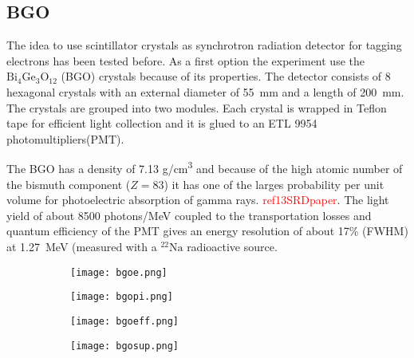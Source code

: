 \subsection{BGO}
The idea to use scintillator crystals as synchrotron radiation detector for tagging electrons has been tested
before\cite{bgosync}. As a first option the experiment use the $\mathrm{Bi_4Ge_3O_{12}}$ (BGO) crystals because of its
properties. The detector consists of 8 hexagonal crystals with an external diameter of \SI{55}{mm} and a length of
\SI{200}{mm}. The crystals are grouped into two modules. Each crystal is wrapped in Teflon tape for efficient light
collection and it is glued to an ETL 9954 photomultipliers(PMT).\par
The BGO has a density of 7.13 \si{\gram/\cubic\centi\metre} and because of the high atomic number of the bismuth
component ($Z=83$) it has one of the larges probability per unit volume for photoelectric absorption of gamma rays.
\textcolor{red}{ref13SRDpaper}. The light yield of about 8500 photons/MeV coupled to the transportation losses and
quantum efficiency of the PMT gives an energy resolution of about 17\% (FWHM) at \SI{1.27}{MeV} (measured with a
$\mathrm{^{22}Na}$ radioactive source.\par

\begin{figure}[ht]
		\centering
		\hspace*{\fill}
		\begin{subfigure}[b]{0.45\textwidth}
			\centering
			\texttt{[image: bgoe.png]}
			\caption{}\label{}
		\end{subfigure}
		\hfill
		\begin{subfigure}[b]{0.45\textwidth}
			\centering
			\texttt{[image: bgopi.png]}
			\caption{}\label{}
		\end{subfigure}
		\hspace*{\fill}
		\caption{}\label{}
\end{figure}
\begin{figure}[ht]
		\centering
		\hspace*{\fill}
		\begin{subfigure}[b]{0.45\textwidth}
			\centering
			\texttt{[image: bgoeff.png]}
			\caption{}\label{}
		\end{subfigure}
		\hfill
		\begin{subfigure}[b]{0.45\textwidth}
			\centering
			\texttt{[image: bgosup.png]}
			\caption{}\label{}
		\end{subfigure}
		\hspace*{\fill}
		\caption{}\label{}
\end{figure}


